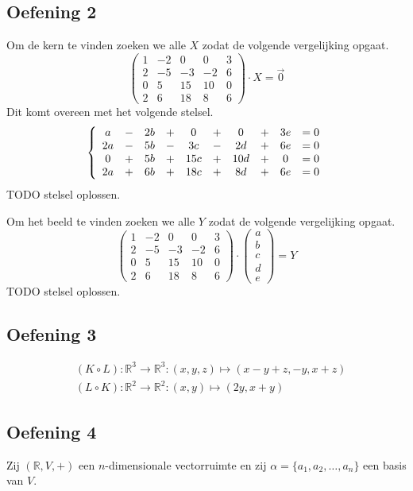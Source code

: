 \documentclass[lineaire_algebra_oplossingen.tex]{subfiles}
\begin{document}
\subsection{Oefening 2}
Om de kern te vinden zoeken we alle $X$ zodat de volgende vergelijking opgaat.
\[
\begin{pmatrix}
1 & -2 & 0 & 0 & 3\\
2 & -5 & -3 & -2 & 6\\
0 & 5 & 15 & 10 & 0\\
2 & 6 & 18 & 8 & 6
\end{pmatrix}
\cdot X
= \vec{0}
\]
Dit komt overeen met het volgende stelsel.
\[
\left\lbrace
\begin{array}{c c c c c c c c c c}
a &-& 2b &+& 0 &+& 0 &+& 3e &= 0\\
2a &-& 5b &-& 3c &-& 2d &+& 6e &= 0\\
0 &+& 5b &+& 15c &+& 10d &+& 0&= 0\\
2a &+& 6b &+& 18c &+& 8d &+& 6e &= 0
\end{array}
\right.
\]
TODO stelsel oplossen.

Om het beeld te vinden zoeken we alle $Y$ zodat de volgende vergelijking opgaat.
\[
\begin{pmatrix}
1 & -2 & 0 & 0 & 3\\
2 & -5 & -3 & -2 & 6\\
0 & 5 & 15 & 10 & 0\\
2 & 6 & 18 & 8 & 6
\end{pmatrix}
\cdot 
\begin{pmatrix}
a\\b\\c\\d\\e
\end{pmatrix}
= Y
\]
TODO stelsel oplossen.

\subsection{Oefening 3}
\begin{align*}
& (K\circ L): \mathbb{R}^3\rightarrow\mathbb{R}^3 :(x,y,z)\mapsto (x-y+z,-y,x+z) \\
& (L\circ K): \mathbb{R}^2\rightarrow\mathbb{R}^2 :(x,y)\mapsto (2y,x+y)
\end{align*}

\subsection{Oefening 4}
Zij $(\mathbb{R},V,+)$ een $n$-dimensionale vectorruimte en zij $\alpha = \{a_1,a_2,\ldots,a_n\}$ een basis van $V$.
\end{document}
